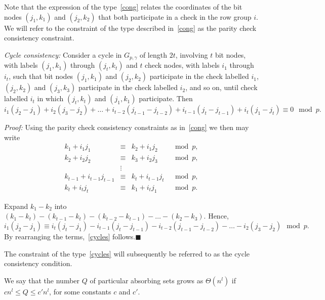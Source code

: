 Note that the expression of the type~\eqref{cong} relates the
coordinates of the bit nodes $(j_1,k_1)$ and $(j_2,k_2)$ that both
participate in a check in the row group $i$. We will refer to the
constraint of the type described in~\eqref{cong} as the parity check
consistency constraint.

\begin{lemma}\label{cyclelemma}\textit{Cycle consistency:} Consider a cycle in $G_{p,\gamma}$ of
length $2t$, involving $t$ bit nodes, with labels $(j_1,k_1)$
through $(j_t,k_t)$ and $t$ check nodes, with labels $i_1$ through
$i_t$, such that bit nodes $(j_1,k_1)$ and $(j_2,k_2)$ participate
in the check labelled $i_1$, $(j_2,k_2)$ and $(j_3,k_3)$ participate
in the check labelled $i_2$, and so on, until check labelled $i_t$
in which $(j_t,k_t)$ and $(j_1,k_1)$ participate. Then
\begin{equation}\label{cycles}
i_1(j_2-j_1)+i_2(j_3-j_2)+\dots+i_{t-2}(j_{t-1}-j_{t-2})+i_{t-1}(j_t-j_{t-1})+
i_t(j_1-j_t) \equiv 0 \mod p.
\end{equation}
\end{lemma}
\noindent \textit{Proof:} Using the parity check consistency
constraints as in~\eqref{cong} we then may write
\begin{equation}\begin{array}{cccc}
k_1+i_1j_1 &\equiv&k_2+i_1j_2 & \mod p, \\
k_2+i_2j_2 &\equiv&k_3+i_2j_3 & \mod p, \\
{} & \vdots & {}\\
k_{t-1}+i_{t-1}j_{t-1} &\equiv&k_t+i_{t-1}j_t & \mod p, \\
k_t+i_tj_t &\equiv&k_1+i_tj_1 & \mod p.
\end{array}\end{equation}

Expand $k_1-k_2$ into
$(k_1-k_t)-(k_{t-1}-k_t)-(k_{t-2}-k_{t-1})-\dots-(k_2-k_3)$.
Hence,
\begin{equation}
i_1(j_2-j_1) \equiv
i_t(j_t-j_1)-i_{t-1}(j_t-j_{t-1})-i_{t-2}(j_{t-1}-j_{t-2})-\dots-i_2(j_3-j_2)
\mod p.
\end{equation} By rearranging the terms,~\eqref{cycles} follows.\hfill$\blacksquare$

 The constraint of the type~\eqref{cycles} will subsequently be
referred to as the cycle consistency condition.

We say that the number $Q$ of particular absorbing sets  grows as
$\Theta(n^l)$ if $cn^l \leq Q \leq c'n^l$, for some constants $c$
and $c'$.


